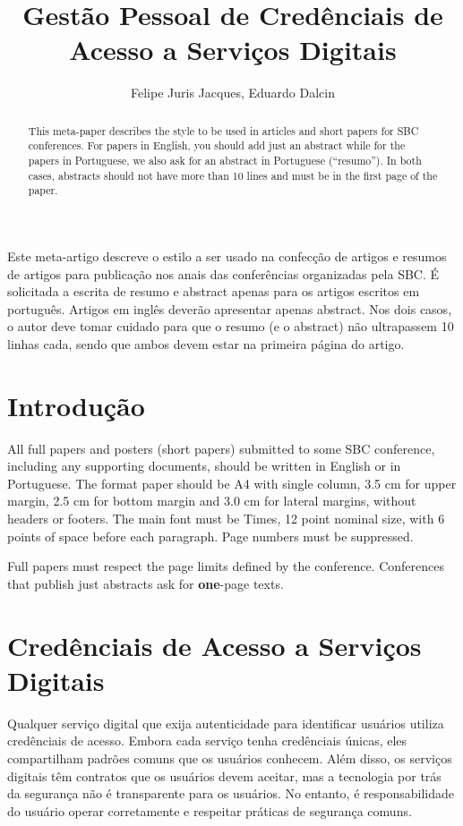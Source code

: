 \documentclass[12pt]{article}
\title{Gestão Pessoal de Credênciais de Acesso a Serviços Digitais}
\author{Felipe Juris Jacques\inst{1}, Eduardo Dalcin\inst{1} }
\begin{document}
 

\maketitle

\begin{abstract}
  This meta-paper describes the style to be used in articles and short papers
  for SBC conferences. For papers in English, you should add just an abstract
  while for the papers in Portuguese, we also ask for an abstract in
  Portuguese (``resumo''). In both cases, abstracts should not have more than
  10 lines and must be in the first page of the paper.
\end{abstract}
     
\begin{resumo} 
  Este meta-artigo descreve o estilo a ser usado na confecção de artigos e
  resumos de artigos para publicação nos anais das conferências organizadas
  pela SBC. É solicitada a escrita de resumo e abstract apenas para os artigos
  escritos em português. Artigos em inglês deverão apresentar apenas abstract.
  Nos dois casos, o autor deve tomar cuidado para que o resumo (e o abstract)
  não ultrapassem 10 linhas cada, sendo que ambos devem estar na primeira
  página do artigo.
\end{resumo}


\section{Introdução}

All full papers and posters (short papers) submitted to some SBC conference,
including any supporting documents, should be written in English or in
Portuguese. The format paper should be A4 with single column, 3.5 cm for upper
margin, 2.5 cm for bottom margin and 3.0 cm for lateral margins, without
headers or footers. The main font must be Times, 12 point nominal size, with 6
points of space before each paragraph. Page numbers must be suppressed.

Full papers must respect the page limits defined by the conference.
Conferences that publish just abstracts ask for \textbf{one}-page texts.

\section{Credênciais de Acesso a Serviços Digitais} \label{sec:firstpage}

Qualquer serviço digital que exija autenticidade para identificar usuários
utiliza credênciais de acesso.
Embora cada serviço tenha credênciais únicas, eles compartilham padrões
comuns que os usuários conhecem.
Além disso, os serviços digitais têm contratos que os usuários devem aceitar,
mas a tecnologia por trás da segurança não é transparente para os usuários.
No entanto, é responsabilidade do usuário operar corretamente e respeitar
práticas de segurança comuns.
\end{document}
